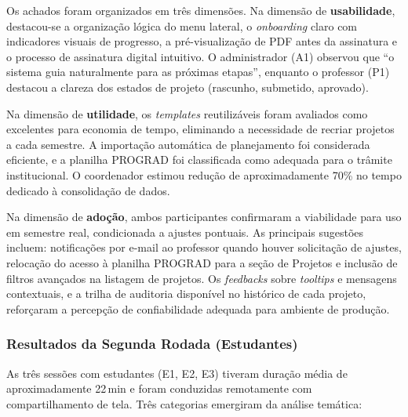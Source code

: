 \documentclass[portuguese]{sbc2025}%
\begin{document}
Os achados foram organizados em três dimensões. Na dimensão de \textbf{usabilidade}, destacou-se a organização lógica do menu lateral, o \textit{onboarding} claro com indicadores visuais de progresso, a pré-visualização de PDF antes da assinatura e o processo de assinatura digital intuitivo. O administrador (A1) observou que ``o sistema guia naturalmente para as próximas etapas'', enquanto o professor (P1) destacou a clareza dos estados de projeto (rascunho, submetido, aprovado).

Na dimensão de \textbf{utilidade}, os \textit{templates} reutilizáveis foram avaliados como excelentes para economia de tempo, eliminando a necessidade de recriar projetos a cada semestre. A importação automática de planejamento foi considerada eficiente, e a planilha PROGRAD foi classificada como adequada para o trâmite institucional. O coordenador estimou redução de aproximadamente 70\% no tempo dedicado à consolidação de dados.

Na dimensão de \textbf{adoção}, ambos participantes confirmaram a viabilidade para uso em semestre real, condicionada a ajustes pontuais. As principais sugestões incluem: notificações por e-mail ao professor quando houver solicitação de ajustes, relocação do acesso à planilha PROGRAD para a seção de Projetos e inclusão de filtros avançados na listagem de projetos. Os \textit{feedbacks} sobre \textit{tooltips} e mensagens contextuais, e a trilha de auditoria disponível no histórico de cada projeto, reforçaram a percepção de confiabilidade adequada para ambiente de produção.

\subsubsection{Resultados da Segunda Rodada (Estudantes)}
\label{sec:resultados-estudantes}

As três sessões com estudantes (E1, E2, E3) tiveram duração média de aproximadamente 22\,min e foram conduzidas remotamente com compartilhamento de tela. Três categorias emergiram da análise temática:
\end{document}
